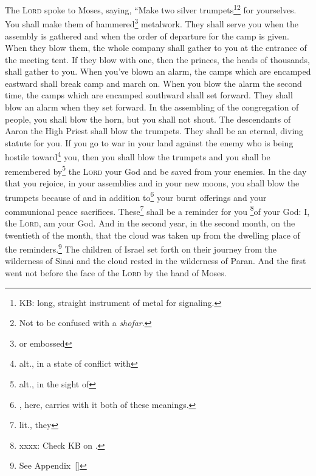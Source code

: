 
\begin{enumerate*}[mode=unboxed]
     The \textsc{Lord} spoke to Moses, saying,%
     ``Make two silver trumpets\footnote{KB: long, straight instrument of metal for signaling.}\footnote{Not to be confused with a \textit{shofar}.} for yourselves. You shall make them of hammered\footnote{or embossed} metalwork. They shall serve you when the assembly is gathered and when the order of departure for the camp is given.%
     When they blow them, the whole company shall gather to you at the entrance of the meeting tent.%
     If they blow with one, then the princes, the heads of thousands, shall gather to you.%
     When you've blown an alarm, the camps which are encamped eastward shall break camp and march on.%
     When you blow the alarm the second time, the camps which are encamped southward shall set forward. They shall blow an alarm when they set forward.%
     In the assembling of the congregation of people, you shall blow the horn, but you shall not shout.%
     The descendants of Aaron the High Priest shall blow the trumpets. They shall be an eternal, diving statute for you.%
     If you go to war in your land against the enemy who is being hostile toward\footnote{alt., in a state of conflict with} you, then you shall blow the trumpets and you shall be remembered by\footnote{alt., in the sight of} the \textsc{Lord} your God and be saved from your enemies.%
     In the day that you rejoice, in your assemblies and in your new moons, you shall blow the trumpets because of and in addition to\footnote{, here, carries with it both of these meanings.} your burnt offerings and your communional peace sacrifices. These\footnote{lit., they} shall be a reminder for you \footnote{xxxx: Check KB on .}of your God: I, the \textsc{Lord}, am your God.%
     And in the second year, in the second month, on the twentieth of the month, that the cloud was taken up from the dwelling place of the reminders.\footnote{See Appendix~\ref{}}%
     The children of Israel set forth on their journey from the wilderness of Sinai and the cloud rested in the wilderness of Paran.%
     And the first went not before the face of the \textsc{Lord} by the hand of Moses.%

\end{enumerate*}
